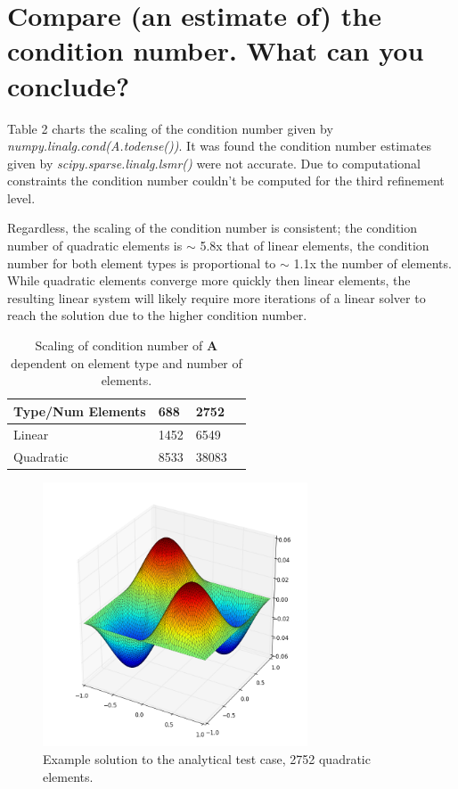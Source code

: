 \documentclass[letterpaper,10pt]{article}
\begin{document}
\section*{Compare (an estimate of) the condition number. What can you conclude?}
Table 2 charts the scaling of the condition number given by \textit{numpy.linalg.cond(A.todense())}. It was found the condition number estimates given by \textit{scipy.sparse.linalg.lsmr()} were not accurate. Due to computational constraints the condition number couldn't be computed for the third refinement level.

Regardless, the scaling of the condition number is consistent; the condition number of quadratic elements is $\sim$ 5.8x that of linear elements, the condition number for both element types is proportional to $\sim$ 1.1x the number of elements. While quadratic elements converge more quickly then linear elements, the resulting linear system will likely require more iterations of a linear solver to reach the solution due to the higher condition number.
\begin{table}[!htb]
\centering
    \begin{tabular}{|l|l|l|l|}
        \hline
        Type/Num Elements & 688  & 2752 \\ \hline
        Linear            & 1452 & 6549  \\
        Quadratic         & 8533 & 38083 \\
        \hline
    \end{tabular}
    \caption{Scaling of condition number of $\mathbf{A}$ dependent on element type and number of elements.}
\end{table}

\newpage 
\begin{figure}[!htb]
\centering
\includegraphics[width=0.7\textwidth]{periodic.PNG}
\caption{Example solution to the analytical test case, 2752 quadratic elements.}
\end{figure}
\end{document}
